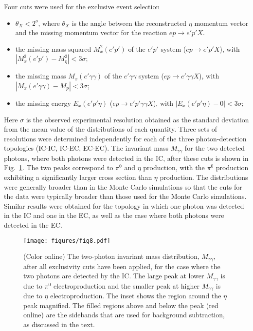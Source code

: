 \documentclass[prc,aps,floatfix,showpacs,showkeys,twocolumn,superscriptaddress,letterpaper,10pt]{revtex4-1}
\begin{document}
Four cuts were used for the exclusive event selection \begin{itemize}

\item   $\theta_X<2^o$, where   $\theta_X$ is  the angle between the reconstructed  
$\eta$ momentum vector and the missing momentum vector for the reaction $ep\to e'p'X$.
\item the missing mass squared $M_x^2(e'p')$ of the $e'p'$ system  ($ep\to e'p'X$), with $| M_x^2(e'p') - M^2_{\eta}| < 3\sigma$;
\item the missing mass $M_x(e'\gamma\gamma)$ of the $e'\gamma\gamma$ system  ($ep\to e'\gamma\gamma X$), with $|M_x(e'\gamma\gamma)-M_{p}| < 3\sigma$;
\item the missing energy  $E_x(e'p'\eta)$ ($ep\to e'p'\gamma\gamma X$), with $|E_x(e'p'\eta)- 0| < 3\sigma$;
\end{itemize}
\noindent
Here $\sigma $ is the observed experimental resolution obtained as the standard deviation from the mean value of the distributions of each quantity. Three sets of resolutions were determined independently for each of the three photon-detection topologies (IC-IC, IC-EC, EC-EC). The invariant mass $M_{\gamma\gamma}$ for the two detected photons, where both photons were detected in the IC, after these cuts  is shown in Fig.~\ref{Mgg}. The two peaks correspond to  $\pi^0$ and $\eta$ production, with the $\pi^0$ production exhibiting a significantly larger  cross section than  $\eta$ production. The distributions were generally broader than  in the Monte Carlo simulations so that the cuts for the data were typically broader than those used for the Monte Carlo simulations.
Similar results were obtained for the topology in which one photon was detected in the IC and one in the EC, as well as the case where both photons were detected in the EC.

\begin{figure}
\texttt{[image: figures/fig8.pdf]}
\caption{
\label{Mgg}
(Color online)  The two-photon invariant  mass distribution, $M_{\gamma\gamma}$, after all exclusivity cuts have been applied, 
for the case where the two photons are detected by the IC. The large peak at lower $M_{\gamma\gamma}$ is due to $\pi^0$ electroproduction and the smaller peak at higher 
$M_{\gamma\gamma}$ is due to $\eta$ electroproduction. 
The inset shows the region around the $\eta$ peak magnified. The filled regions above and below the peak (red online) are the sidebands that are used for background subtraction, as discussed in the text.
}
\end{figure}
\end{document}
